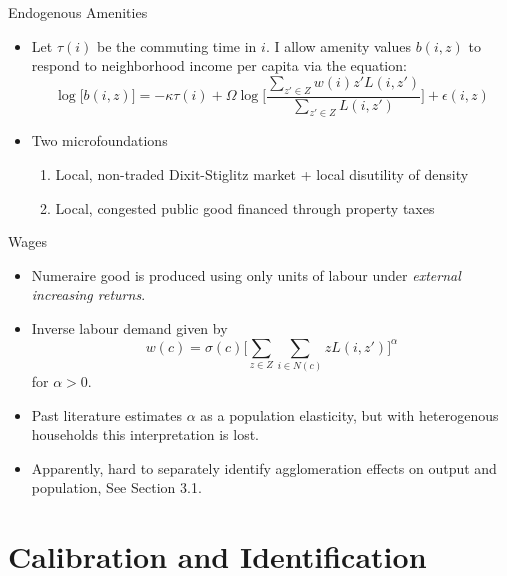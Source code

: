 \documentclass{beamer}
\theoremstyle{plain}
\begin{document}
\begin{frame}{Endogenous Amenities}
	\begin{itemize}
		\color{black}
		\itemsep1em
		\item  Let $\tau(i)$ be the commuting time in $i$. I allow amenity values $b(i, z)$ to respond to neighborhood income per capita via the equation:
		\begin{equation}
			 	\log\big[b(i, z)\big] = -\kappa\tau(i) + \Omega\log\bigg[\frac{\sum_{z' \in Z}w(i)z'L(i, z')}{\sum_{z' \in Z}L(i, z')}\bigg] + \epsilon(i, z)
		\end{equation} \pause
	\item Two microfoundations 
	\begin{enumerate}
		\itemsep1em
		\item Local, non-traded Dixit-Stiglitz market  \citep{Coutureetal} \citep{AlmagroDI} + local disutility of density \citep{KSC} \pause
		\item Local, congested public good financed through property taxes \citep{calabresetal} \citep{ineffTiebout}
	\end{enumerate}
	\end{itemize}
\end{frame}

\begin{frame}{Wages}
	\begin{itemize}
		\color{black}
		\itemsep1em
		\item Numeraire good is produced using only units of labour under \textit{external increasing returns}.
		\item Inverse labour demand given by
		\begin{equation}
			w(c) = \sigma(c)\bigg[\sum_{z \in Z}\sum_{i \in N(c)}zL(i, z')\bigg]^{\alpha}
		\end{equation}
	for $\alpha > 0$.
	\item Past literature estimates $\alpha$ as a population elasticity, but with heterogenous households this interpretation is lost. 
	\item Apparently, hard to separately identify agglomeration effects on output and population, See \cite{Agglomerationemp} Section 3.1. 
	\end{itemize}
\end{frame}

\section{Calibration and Identification}
\end{document}
